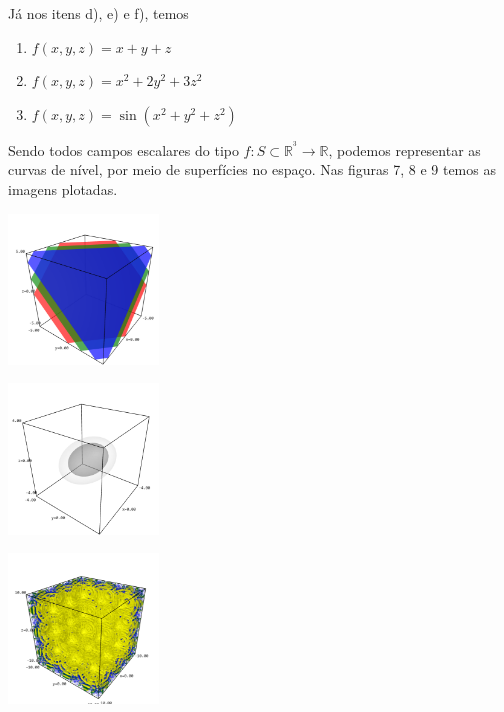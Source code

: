 \documentclass[../main.tex]{subfiles}
\begin{document}
\begin{solucao}
			Já nos itens d), e) e f), temos
			\begin{enumerate}[label=\alph*)]
				\item $f(x,y,z)=x+y+z$
				\item $f(x,y,z)=x^2+2y^2+3z^2$
				\item $f(x,y,z)=\sin(x^2+y^2+z^2)$
			\end{enumerate}
			
			Sendo todos campos escalares do tipo $f:S\subset \mathbb{R}^^3\rightarrow \mathbb{R}$, podemos representar as curvas de nível, por meio de superfícies no espaço. Nas figuras 7, 8 e 9 temos as imagens plotadas.
			
			\begin{center}
				\includegraphics[width=0.3\textwidth]{imagens/lista03/picture_lista03_q01_item04.png}
			\end{center}
			
			\begin{center}
				\includegraphics[width=0.3\textwidth]{imagens/lista03/picture_lista03_q01_item05.png}
			\end{center}
			
			\begin{center}
				\includegraphics[width=0.3\textwidth]{imagens/lista03/picture_lista03_q01_item06.png}
			\end{center}
			

\end{solucao}
\end{document}
